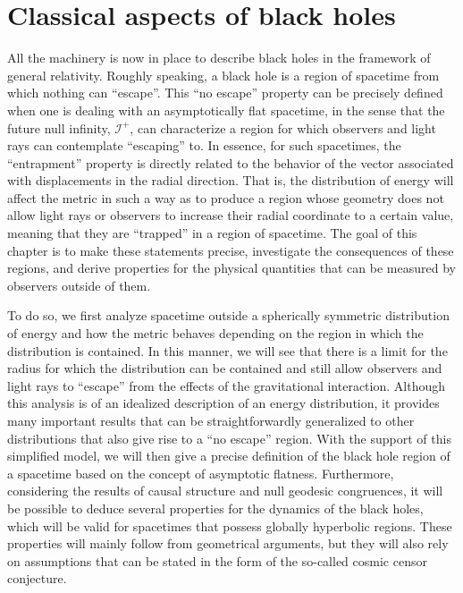 \documentclass[
12pt,		%
openright,	%
twoside,  %
a4paper,			%
chapter=TITLE,		%
english,			%
french,				%
spanish,			%
brazil				%
]{USPSC-classe/USPSC}
\begin{document}
\chapter{Classical aspects of black holes}\label{chapter2}

All the machinery is now in place to describe black holes in the framework of general relativity. Roughly speaking, a black hole is a region of spacetime from which nothing can ``escape''. This “no escape” property can be precisely defined when one is dealing with an asymptotically flat spacetime, in the sense that the future null infinity, $\mathscr{I}^+$, can characterize a region for which observers and light rays can contemplate ``escaping'' to. In essence, for such spacetimes, the ``entrapment'' property is directly related to the behavior of the vector associated with displacements in the radial direction. That is, the distribution of energy will affect the metric in such a way as to produce a region whose geometry does not allow light rays or observers to increase their radial coordinate to a certain value, meaning that they are “trapped” in a region of spacetime. The goal of this chapter is to make these statements precise, investigate the consequences of these regions, and derive properties for the physical quantities that can be measured by observers outside of them.

To do so, we first analyze spacetime outside a spherically symmetric distribution of energy and how the metric behaves depending on the region in which the distribution is contained. In this manner, we will see that there is a limit for the radius for which the distribution can be contained and still allow observers and light rays to ``escape'' from the effects of the gravitational interaction. Although this analysis is of an idealized description of an energy distribution, it provides many important results that can be straightforwardly generalized to other distributions that also give rise to a “no escape” region. With the support of this simplified model, we will then give a precise definition of the black hole region of a spacetime based on the concept of asymptotic flatness. Furthermore, considering the results of causal structure and null geodesic congruences, it will be possible to deduce several properties for the dynamics of the black holes, which will be valid for spacetimes that possess globally hyperbolic regions. These properties will mainly follow from geometrical arguments, but they will also rely on assumptions that can be stated in the form of the so-called cosmic censor conjecture.
\end{document}
